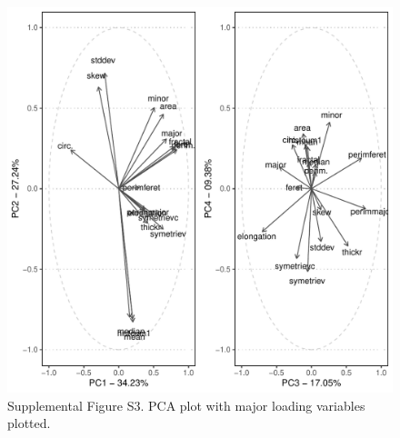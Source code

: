 \documentclass[
]{article}
\begin{document}
\begin{figure}

{\centering \includegraphics[width=1\textwidth,height=1\textheight]{index_files/figure-pdf/unnamed-chunk-21-1.pdf}

}

\caption{Supplemental Figure S3. PCA plot with major loading variables
plotted.}

\end{figure}
\end{document}
